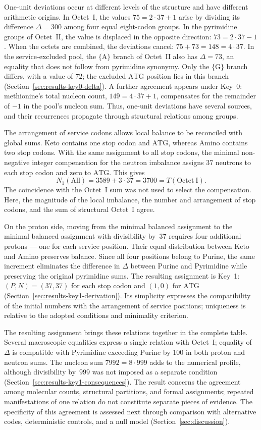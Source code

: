 \documentclass[11pt,a4paper]{article}
\renewcommand{\_}{\origunderscore\allowbreak}
\begin{document}
One-unit deviations occur at different levels of the
structure and have different arithmetic origins.
In Octet~I, the values $75=2\cdot37+1$ arise by dividing
its difference $\Delta=300$ among four equal
eight-codon groups. In the pyrimidine groups of Octet~II,
the value is displaced in the opposite direction:
$73=2\cdot37-1$. When the octets are combined,
the deviations cancel: $75+73=148=4\cdot37$.
In the service-excluded pool, the $\{\mathrm{A}\}$ branch
of Octet~II also has $\Delta=73$, an equality that
does not follow from pyrimidine synonymy.
Only the $\{\mathrm{G}\}$ branch differs, with a value
of $72$; the excluded $\mathrm{ATG}$ position lies
in this branch
(Section~\ref{sec:results-key0-delta}).
A further agreement appears under Key~0:
methionine's total nucleon count, $149=4\cdot37+1$,
compensates for the remainder of $-1$ in the pool's
nucleon sum. Thus, one-unit deviations have several
sources, and their recurrences propagate through
structural relations among groups.

The arrangement of service codons allows local balance
to be reconciled with global sums.
Keto contains one stop codon and $\mathrm{ATG}$,
whereas Amino contains two stop codons. With the same
assignment to all stop codons, the minimal non-negative
integer compensation for the neutron imbalance assigns
$37$ neutrons to each stop codon and zero to $\mathrm{ATG}$.
This gives
\[
N_1(\mathrm{All})=3589+3\cdot37
               =3700=T(\mathrm{Octet~I}).
\]
The coincidence with the Octet~I sum was not used
to select the compensation. Here, the magnitude of
the local imbalance, the number and arrangement of
stop codons, and the sum of structural Octet~I agree.

On the proton side, moving from the minimal balanced
assignment to the minimal balanced assignment with
divisibility by~$37$ requires four additional protons
--- one for each service position.
Their equal distribution between Keto and Amino
preserves balance. Since all four positions belong
to Purine, the same increment eliminates the difference
in $\Delta$ between Purine and Pyrimidine while preserving
the original pyrimidine sums. The resulting assignment
is Key~1: $(P,N)=(37,37)$ for each stop codon and $(1,0)$
for $\mathrm{ATG}$
(Section~\ref{sec:results-key1-derivation}).
Its simplicity expresses the compatibility of the
initial numbers with the arrangement of service positions;
uniqueness is relative to the adopted conditions
and minimality criterion.

The resulting assignment brings these relations together
in the complete table. Several macroscopic equalities express a single relation
with Octet~I; equality of $\Delta$ is compatible with
Pyrimidine exceeding Purine by $100$ in both proton
and neutron sums. The nucleon sum $7992=8\cdot999$ adds
to the numerical profile, although divisibility by~$999$
was not imposed as a separate condition
(Section~\ref{sec:results-key1-consequences}).
The result concerns the agreement among molecular
counts, structural partitions, and formal assignments;
repeated manifestations of one relation do not constitute
separate pieces of evidence. The specificity of this
agreement is assessed next through comparison with
alternative codes, deterministic controls, and a null
model
(Section~\ref{sec:discussion}).
\end{document}
